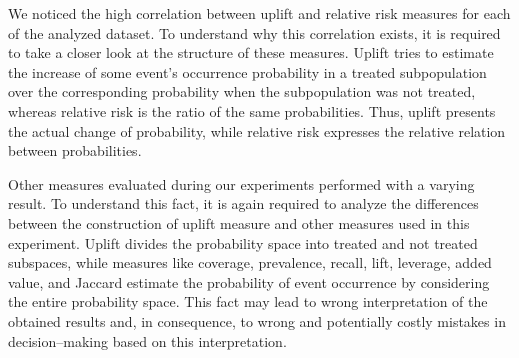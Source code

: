 \documentclass[runningheads,a4paper]{llncs}
\begin{document}
We noticed the high correlation between uplift and relative risk measures for each of the analyzed dataset.
To understand why this correlation exists, it is required to take a closer look at the structure of these measures.
Uplift tries to estimate the increase of some event's occurrence probability in a treated subpopulation over the corresponding probability when the subpopulation was not treated, whereas relative risk is the ratio of the same probabilities.
Thus, uplift presents the actual change of probability, while relative risk expresses the relative relation between probabilities.

Other measures evaluated during our experiments performed with a varying result.
To understand this fact, it is again required to analyze the differences between the construction of uplift measure and other measures used in this experiment.
Uplift divides the probability space into treated and not treated subspaces, while measures like coverage, prevalence, recall, lift, leverage, added value, and Jaccard estimate the probability of event occurrence by considering the entire probability space.
This fact may lead to wrong interpretation of the obtained results and, in consequence, to wrong and potentially costly mistakes in decision--making based on this interpretation.
\end{document}
